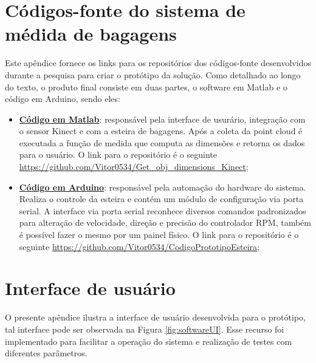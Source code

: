 \begin{apendicesenv}

\partapendices

\chapter{Códigos-fonte do sistema de médida de bagagens}
\label{apend_Códigos fonte do sistema de médida de bagagens}

    Este apêndice fornece os links para os repositórios dos códigos-fonte desenvolvidos durante a pesquisa para criar o protótipo da solução. Como detalhado ao longo do texto, o produto final consiste em duas partes, o software em Matlab e o código em Arduino, sendo eles:

\begin{itemize}
        \item \href{https://github.com/Vitor0534/Get_obj_dimensions_Kinect}{\textbf{Código em Matlab}}: responsável pela interface de usurário, integração com o sensor Kinect e com a esteira de bagagens. Após a coleta da point cloud é executada a função de medida que computa as dimensões e retorna os dados para o usuário. O link para o repositório é o seguinte \url{https://github.com/Vitor0534/Get_obj_dimensions_Kinect};
        
        \item \href{https://github.com/Vitor0534/CodigoPrototipoEsteira}{\textbf{Código em Arduino}}: responsável pela automação do hardware do sistema. Realiza o controle da esteira e contém um módulo de configuração via porta serial. A interface via porta serial reconhece diversos comandos padronizados para alteração de velocidade, direção e precisão do controlador RPM, também é possível fazer o mesmo por um painel físico. O link para o repositório é o seguinte \url{https://github.com/Vitor0534/CodigoPrototipoEsteira};
\end{itemize}



\chapter{Interface de usuário}
\label{apend_Interface de usuário}

    O presente apêndice ilustra a interface de usuário desenvolvida para o protótipo, tal interface pode ser observada na Figura \ref{fig:softwareUI}. Esse recurso foi implementado para facilitar a operação do sistema e realização de testes com diferentes parâmetros. 


\end{apendicesenv}
